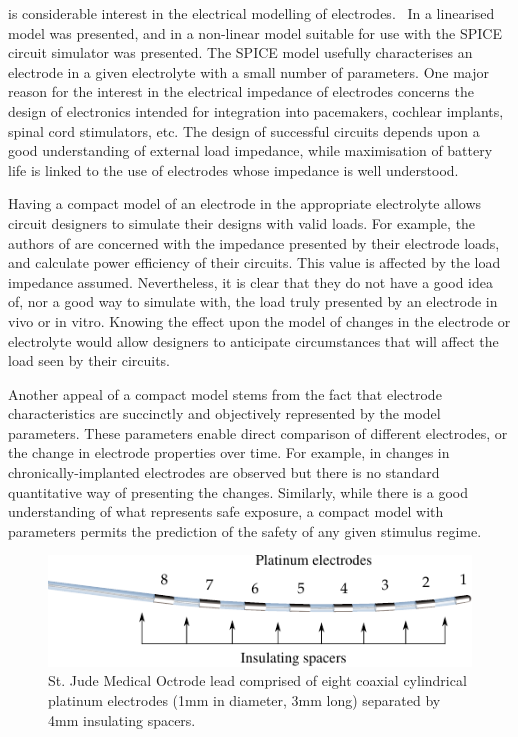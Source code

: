 \documentclass[journal, a4paper]{IEEEtran}
\begin{document}
 is considerable interest in the electrical modelling of electrodes.~\cite{Cogan2008,Brown2008,Guo2012,Troy2006}
In \cite{Franks2005} a linearised model was presented, and in \cite{ScottSingle2013} a non-linear model suitable for use with the SPICE circuit simulator was presented.
The SPICE model usefully characterises an electrode in a given electrolyte with a small number of parameters.
One major reason for the interest in the electrical impedance of electrodes concerns the design of electronics intended for integration into pacemakers, cochlear implants, spinal cord stimulators, etc.
The design of successful circuits depends upon a good understanding of external load impedance, while maximisation of battery life is linked to the use of electrodes whose impedance is well understood.

Having a compact model of an electrode in the appropriate electrolyte allows circuit designers to simulate their designs with valid loads.
For example, the authors of \cite{Ethier2011} are concerned with the impedance presented by their electrode loads, and calculate power efficiency of their circuits.
This value is affected by the load impedance assumed.
Nevertheless, it is clear that they do not have a good idea of, nor a good way to simulate with, the load truly presented by an electrode in vivo or in vitro.
Knowing the effect upon the model of changes in the electrode or electrolyte would allow designers to anticipate circumstances that will affect the load seen by their circuits. 

Another appeal of a compact model stems from the fact that electrode characteristics are succinctly and objectively represented by the model parameters.
These parameters enable direct comparison of different electrodes, or the change in electrode properties over time.
For example, in \cite{Kane13} changes in chronically-implanted electrodes are observed but there is no standard quantitative way of presenting the changes.
Similarly, while there is a good understanding of what represents safe exposure, a compact model with parameters permits the prediction of the safety of any given stimulus regime.~\cite{Merrill05}

\begin{figure}
    \begin{center}
    \includegraphics{graphics/StJudeOctrodeDiagram}
    \end{center}
    \caption{St. Jude Medical Octrode lead comprised of eight coaxial cylindrical platinum electrodes (1mm in diameter, 3mm long) separated by 4mm insulating spacers.}
    \label{fig:octrode}
\end{figure}
\end{document}
